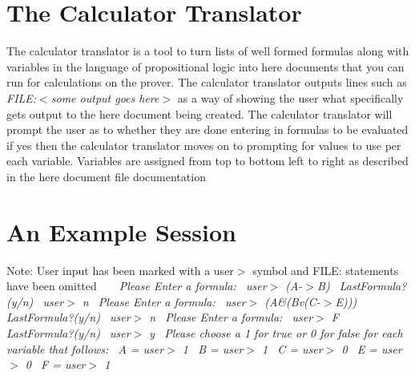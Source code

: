 \section*{The Calculator Translator}

The calculator translator is a tool to turn lists of well formed formulas along with variables in the language of propositional logic into here documents that you can run for calculations on the prover. The calculator translator outputs lines such as {\itshape F\+I\+LE\+:$<$some output goes here$>$} as a way of showing the user what specifically gets output to the here document being created. The calculator translator will prompt the user as to whether they are done entering in formulas to be evaluated if yes then the calculator translator moves on to prompting for values to use per each variable. Variables are assigned from top to bottom left to right as described in the here document file documentation

\section*{An Example Session}

Note\+: User input has been marked with a \textquotesingle{}user$>$\textquotesingle{} symbol and \textquotesingle{}F\+I\+LE\+:\textquotesingle{} statements have been omitted ~\newline
 ~\newline
 {\itshape  {\ttfamily  Please Enter a formula\+:~\newline
 user$>$ (A-\/$>$B)~\newline
 Last\+Formula?(y/n)~\newline
 user$>$ n~\newline
 Please Enter a formula\+:~\newline
 user$>$ (A\&(Bv(C-\/$>$E)))~\newline
 Last\+Formula?(y/n)~\newline
 user$>$ n~\newline
 Please Enter a formula\+:~\newline
 user$>$ F~\newline
 Last\+Formula?(y/n)~\newline
 user$>$ y~\newline
 Please choose a 1 for true or 0 for false for each variable that follows\+:~\newline
 A = user$>$ 1~\newline
 B = user$>$ 1~\newline
 C = user$>$ 0~\newline
 E = user$>$ 0~\newline
 F = user$>$ 1~\newline
 } }

